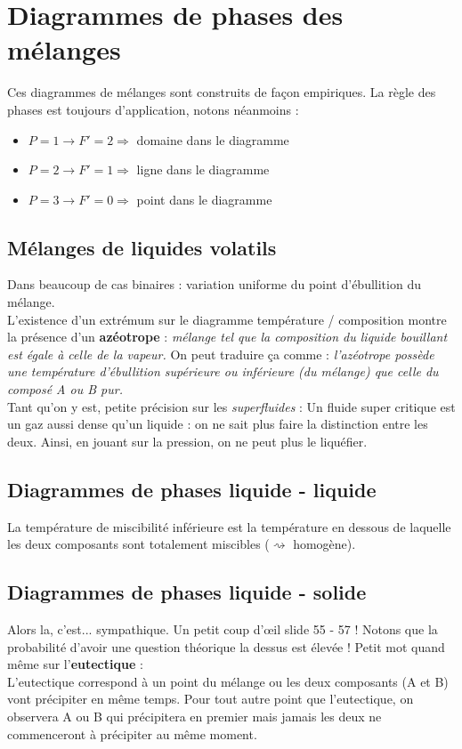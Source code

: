 \documentclass[british,french,11pt, a4paper, openany]{book}
\begin{document}
\section{Diagrammes de phases des mélanges}
Ces diagrammes de mélanges sont construits de façon empiriques. La règle des phases est toujours d'application, notons néanmoins : 
\begin{itemize}
	\item $P = 1 \rightarrow F' = 2 \Rightarrow$ domaine dans le diagramme
	\item $P = 2 \rightarrow F' = 1 \Rightarrow$ ligne dans le diagramme
	\item $P = 3 \rightarrow F' = 0 \Rightarrow$ point dans le diagramme
\end{itemize}
\subsection{Mélanges de liquides volatils}
Dans beaucoup de cas binaires : variation uniforme du point d'ébullition du mélange.\\
L'existence d'un extrémum sur le diagramme température / composition montre la présence d'un \textbf{azéotrope} : \textit{mélange tel que la composition du liquide bouillant est égale à celle de la vapeur.} On peut traduire ça comme : \textit{l'azéotrope possède une température d'ébullition supérieure ou inférieure (du mélange) que celle du composé A ou B pur.}\\

Tant qu'on y est, petite précision sur les \textit{superfluides} : Un fluide super critique est un gaz aussi dense qu'un liquide : on ne sait plus faire la distinction entre les deux. Ainsi, en jouant sur la pression, on ne peut plus le liquéfier.

\subsection{Diagrammes de phases liquide - liquide}
La température de miscibilité inférieure est la température en dessous de laquelle les deux composants sont totalement miscibles ($\rightsquigarrow$ homogène).

\subsection{Diagrammes de phases liquide - solide}
Alors la, c'est... sympathique. Un petit coup d'œil slide 55 - 57 ! Notons que la probabilité d'avoir une question théorique la dessus est élevée ! Petit mot quand même sur l'\textbf{eutectique} :\\
L'eutectique correspond à un point du mélange ou les deux composants (A et B) vont précipiter en même temps. Pour tout autre point que l'eutectique, on observera A ou B qui précipitera en premier mais jamais les deux ne commenceront à précipiter au même moment.
\end{document}
